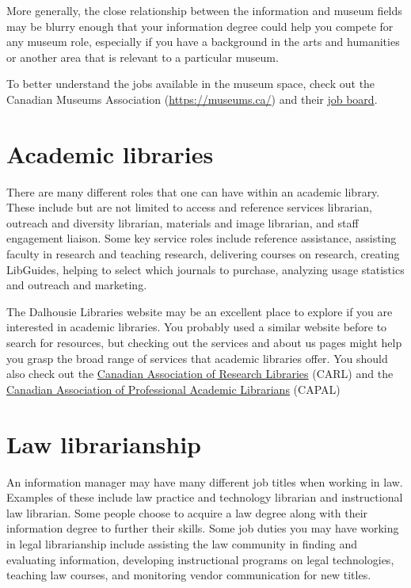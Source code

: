 \documentclass[
  letterpaper,
  DIV=11,
  numbers=noendperiod]{scrreprt}
\begin{document}
More generally, the close relationship between the information and
museum fields may be blurry enough that your information degree could
help you compete for any museum role, especially if you have a
background in the arts and humanities or another area that is relevant
to a particular museum.

To better understand the jobs available in the museum space, check out
the Canadian Museums Association (\url{https://museums.ca/}) and their
\href{https://museums.ca/site/aboutthecma/careersheritageycw/jobsinheritage}{job
board}.

\section{Academic libraries}\label{academic-libraries}

There are many different roles that one can have within an academic
library. These include but are not limited to access and reference
services librarian, outreach and diversity librarian, materials and
image librarian, and staff engagement liaison. Some key service roles
include reference assistance, assisting faculty in research and teaching
research, delivering courses on research, creating LibGuides, helping to
select which journals to purchase, analyzing usage statistics and
outreach and marketing.

The Dalhousie Libraries website may be an excellent place to explore if
you are interested in academic libraries. You probably used a similar
website before to search for resources, but checking out the services
and about us pages might help you grasp the broad range of services that
academic libraries offer. You should also check out the
\href{https://www.carl-abrc.ca/}{Canadian Association of Research
Libraries} (CARL) and the \href{https://capalibrarians.org}{Canadian
Association of Professional Academic Librarians} (CAPAL)

\section{Law librarianship}\label{law-librarianship}

An information manager may have many different job titles when working
in law. Examples of these include law practice and technology librarian
and instructional law librarian. Some people choose to acquire a law
degree along with their information degree to further their skills. Some
job duties you may have working in legal librarianship include assisting
the law community in finding and evaluating information, developing
instructional programs on legal technologies, teaching law courses, and
monitoring vendor communication for new titles.
\end{document}
